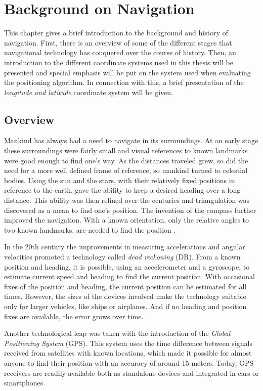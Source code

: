 \documentclass{LTHthesis}
\begin{document}
\chapter{Background on Navigation}
\label{chap:background}
%
This chapter gives a brief introduction to the background and history of navigation. First, there is an overview of some of the different stages that navigational technology has conquered over the course of history. Then, an introduction to the different coordinate systems used in this thesis will be presented and special emphasis will be put on the system used when evaluating the positioning algorithm. In connection with this, a brief presentation of the \emph{longitude and latitude} coordinate system will be given. 
%
\section{Overview}
%
Mankind has always had a need to navigate in its surroundings. At an early stage these surroundings were fairly small and visual references to known landmarks were good enough to find one's way. As the distances traveled grew, so did the need for a more well defined frame of reference, so mankind turned to celestial bodies. Using the sun and the stars, with their relatively fixed positions in reference to the earth, gave the ability to keep a desired heading over a long distance. This ability was then refined over the centuries and triangulation was discovered as a mean to find one's position. The invention of the compass further improved the navigation. With a known orientation, only the relative angles to two known landmarks, are needed to find the position \cite{nav}. 

In the 20th century the improvements in measuring accelerations and angular velocities promoted a technology called \emph{dead reckoning} (DR). From a known position and heading, it is possible, using an accelerometer and a gyroscope, to estimate current speed and heading to find the current position. With occasional fixes of the position and heading, the current position can be estimated for all times. However, the sizes of the devices involved make the technology suitable only for larger vehicles, like ships or airplanes. And if no heading and position fixes are available, the error grows over time.

Another technological leap was taken with the introduction of the \emph{Global Positioning System} (GPS). This system uses the time difference between signals received from satellites with known locations, which made it possible for almost anyone to find their position with an accuracy of around 15 meters. Today, GPS receivers are readily available both as standalone devices and integrated in cars or smartphones.
\end{document}
